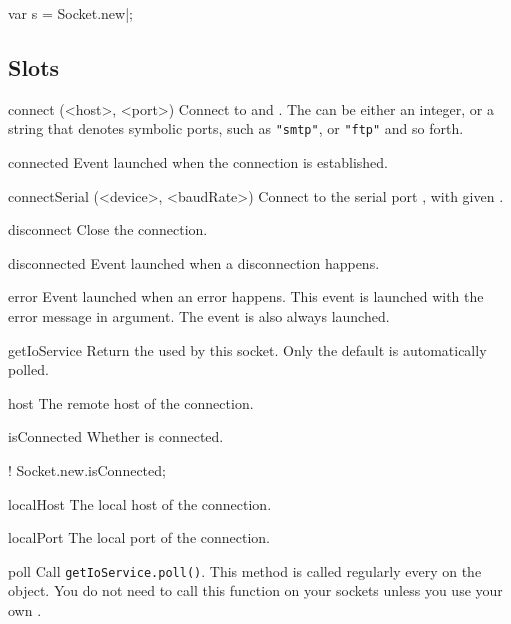 \begin{urbiscript}
var s = Socket.new|;
\end{urbiscript}

\subsection{Slots}
\begin{urbiscriptapi}
\item[connect](<host>, <port>)%
  Connect \this to  and .  The
   can be either an integer, or a string that denotes
  symbolic ports, such as \lstinline|"smtp"|, or \lstinline|"ftp"| and
  so forth.


\item[connected]%
  Event launched when the connection is established.


\item[connectSerial](<device>, <baudRate>)%
  Connect \this to the serial port , with given
  .


\item[disconnect]%
  Close the connection.


\item[disconnected]
  Event launched when a disconnection happens.


\item[error]
  Event launched when an error happens. This event is launched with
  the error message in argument. The event  is
  also always launched.


\item[getIoService] Return the  used by this
  socket. Only the default  is automatically polled.


\item[host]
  The remote host of the connection.


\item[isConnected]
  Whether \this is connected.
\begin{urbiassert}
! Socket.new.isConnected;
\end{urbiassert}

\item[localHost]
  The local host of the connection.


\item[localPort]
  The local port of the connection.


\item[poll] Call \lstinline|getIoService.poll()|. This method is called
  regularly every  on the 
  object. You do not need to call this function on your sockets unless you
  use your own .



\end{urbiscriptapi}
